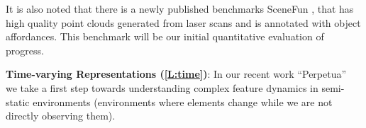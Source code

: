 \documentclass[english,
]{nserc-alliance}
\begin{document}
It is also noted that there is a newly published benchmarks SceneFun \cite{scenefun}, that has high quality point clouds generated from laser scans and is annotated with object affordances. This benchmark will be our initial quantitative evaluation of progress. 


\textbf{Time-varying Representations (\ref{L:time})}:
%
%
In our recent work ``Perpetua''~\cite{saavedra2025perpetua} we take a first step towards understanding complex feature dynamics in semi-static environments (environments where elements change while we are not directly observing them). 
\end{document}

